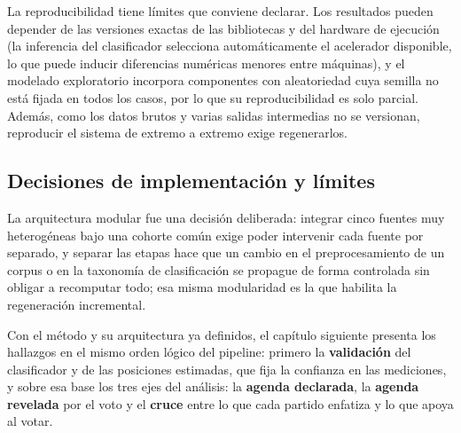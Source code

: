 La reproducibilidad tiene límites que conviene declarar. Los resultados pueden
depender de las versiones exactas de las bibliotecas y del hardware de ejecución
(la inferencia del clasificador selecciona automáticamente el acelerador
disponible, lo que puede inducir diferencias numéricas menores entre máquinas),
y el modelado exploratorio incorpora componentes con aleatoriedad cuya semilla no
está fijada en todos los casos, por lo que su reproducibilidad es solo parcial.
Además, como los datos brutos y varias salidas intermedias no se versionan,
reproducir el sistema de extremo a extremo exige regenerarlos.

\subsection{Decisiones de implementación y límites}
\label{sec:arq-decisiones}

La arquitectura modular fue una decisión deliberada: integrar cinco fuentes muy
heterogéneas bajo una cohorte común exige poder intervenir cada fuente por
separado, y separar las etapas hace que un cambio en el preprocesamiento de un
corpus o en la taxonomía de clasificación se propague de forma controlada sin
obligar a recomputar todo; esa misma modularidad es la que habilita la
regeneración incremental.

Con el método y su arquitectura ya definidos, el capítulo siguiente presenta los
hallazgos en el mismo orden lógico del pipeline: primero la \textbf{validación}
del clasificador y de las posiciones estimadas, que fija la confianza en las
mediciones, y sobre esa base los tres ejes del análisis: la \textbf{agenda
declarada}, la \textbf{agenda revelada} por el voto y el \textbf{cruce} entre lo
que cada partido enfatiza y lo que apoya al votar.
